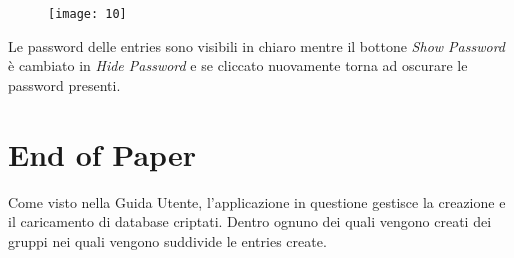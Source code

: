 \documentclass[a4paper,12pt]{report}
\begin{document}
\clearpage
\begin{figure}[h]
\centering{}
\texttt{[image: 10]}
\end{figure}

Le password delle entries sono visibili in chiaro mentre il bottone \textit{Show Password} è cambiato in \textit{Hide Password} e se cliccato nuovamente torna ad oscurare le password presenti.


\section*{End of Paper}
Come visto nella Guida Utente, l'applicazione in questione gestisce la creazione e il caricamento di database criptati. Dentro ognuno dei quali vengono creati dei gruppi nei quali vengono suddivide le entries create.



\end{document}
